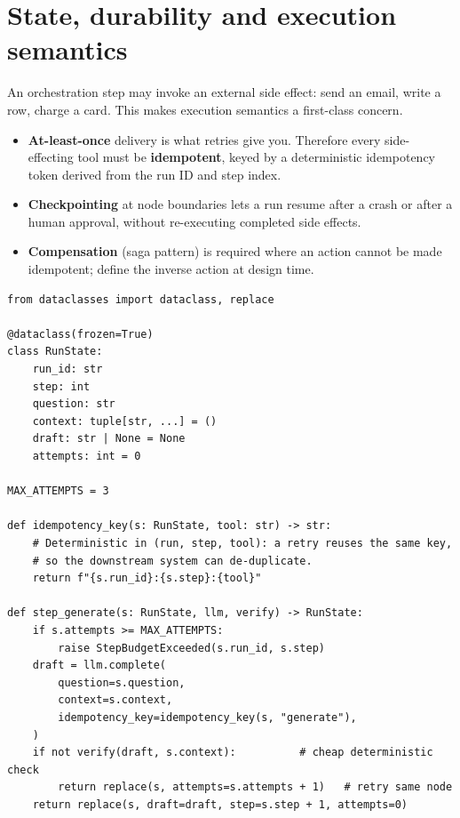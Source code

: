 \documentclass[11pt,twoside,openright]{book}
\theoremstyle{definition}
\theoremstyle{plain}
\theoremstyle{remark}
\newcommand{\term}[1]{\textbf{#1}}
\begin{document}
\section{State, durability and execution semantics}

An orchestration step may invoke an external side effect: send an email, write
a row, charge a card. This makes execution semantics a first-class concern.

\begin{itemize}[leftmargin=1.4em]
  \item \term{At-least-once} delivery is what retries give you. Therefore every
        side-effecting tool must be \term{idempotent}, keyed by a deterministic
        idempotency token derived from the run ID and step index.
  \item \term{Checkpointing} at node boundaries lets a run resume after a crash
        or after a human approval, without re-executing completed side effects.
  \item \term{Compensation} (saga pattern) is required where an action cannot be
        made idempotent; define the inverse action at design time.
\end{itemize}

\begin{lstlisting}[style=py, caption={An orchestration step with an explicit
idempotency key, bounded retries, and a typed state object. The framework is
irrelevant; the contract is not.}]
from dataclasses import dataclass, replace

@dataclass(frozen=True)
class RunState:
    run_id: str
    step: int
    question: str
    context: tuple[str, ...] = ()
    draft: str | None = None
    attempts: int = 0

MAX_ATTEMPTS = 3

def idempotency_key(s: RunState, tool: str) -> str:
    # Deterministic in (run, step, tool): a retry reuses the same key,
    # so the downstream system can de-duplicate.
    return f"{s.run_id}:{s.step}:{tool}"

def step_generate(s: RunState, llm, verify) -> RunState:
    if s.attempts >= MAX_ATTEMPTS:
        raise StepBudgetExceeded(s.run_id, s.step)
    draft = llm.complete(
        question=s.question,
        context=s.context,
        idempotency_key=idempotency_key(s, "generate"),
    )
    if not verify(draft, s.context):          # cheap deterministic check
        return replace(s, attempts=s.attempts + 1)   # retry same node
    return replace(s, draft=draft, step=s.step + 1, attempts=0)
\end{lstlisting}
\end{document}
